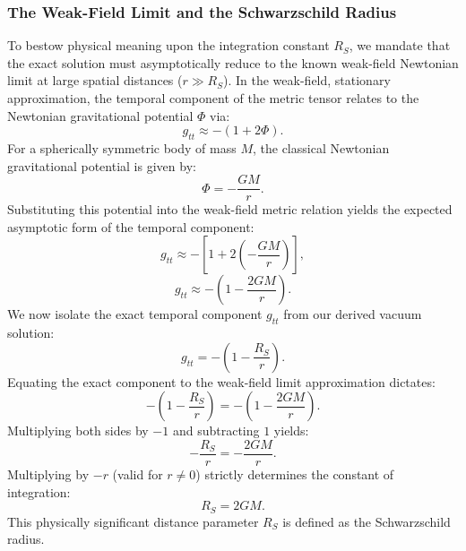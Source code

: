 \documentclass[11pt, a4paper]{report}
\begin{document}
\subsubsection{The Weak-Field Limit and the Schwarzschild Radius}
To bestow physical meaning upon the integration constant $R_S$, we mandate that the exact solution must asymptotically reduce to the known weak-field Newtonian limit at large spatial distances ($r \gg R_S$). In the weak-field, stationary approximation, the temporal component of the metric tensor relates to the Newtonian gravitational potential $\Phi$ via:
\begin{equation}
g_{tt} \approx -(1 + 2\Phi).
\end{equation}
For a spherically symmetric body of mass $M$, the classical Newtonian gravitational potential is given by:
\begin{equation}
\Phi = -\frac{GM}{r}.
\end{equation}
Substituting this potential into the weak-field metric relation yields the expected asymptotic form of the temporal component:
\begin{equation}
g_{tt} \approx -\left[ 1 + 2\left(-\frac{GM}{r}\right) \right],
\end{equation}
\begin{equation}
g_{tt} \approx -\left( 1 - \frac{2GM}{r} \right).
\end{equation}
We now isolate the exact temporal component $g_{tt}$ from our derived vacuum solution:
\begin{equation}
g_{tt} = -\left( 1 - \frac{R_S}{r} \right).
\end{equation}
Equating the exact component to the weak-field limit approximation dictates:
\begin{equation}
-\left( 1 - \frac{R_S}{r} \right) = -\left( 1 - \frac{2GM}{r} \right).
\end{equation}
Multiplying both sides by $-1$ and subtracting $1$ yields:
\begin{equation}
-\frac{R_S}{r} = -\frac{2GM}{r}.
\end{equation}
Multiplying by $-r$ (valid for $r \neq 0$) strictly determines the constant of integration:
\begin{equation}
R_S = 2GM.
\end{equation}
This physically significant distance parameter $R_S$ is defined as the Schwarzschild radius.
\end{document}
